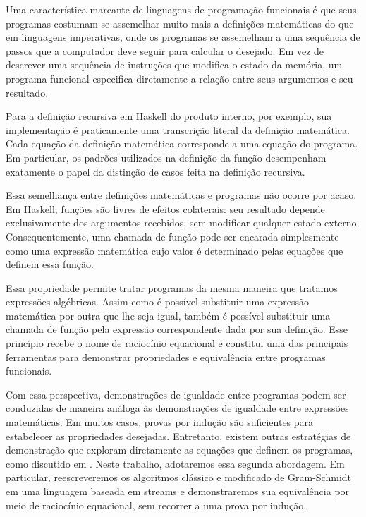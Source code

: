 
Uma característica marcante de linguagens de programação funcionais é que seus programas costumam se assemelhar muito mais a definições matemáticas do que em linguagens imperativas, onde os programas se assemelham a uma sequência de passos que a computador deve seguir para calcular o desejado. Em vez de descrever uma sequência de instruções que modifica o estado da memória, um programa funcional especifica diretamente a relação entre seus argumentos e seu resultado.

Para a definição recursiva em Haskell do produto interno, por exemplo, sua implementação é praticamente uma transcrição literal da definição matemática. Cada equação da definição matemática corresponde a uma equação do programa. Em particular, os padrões utilizados na definição da função desempenham exatamente o papel da distinção de casos feita na definição recursiva.

Essa semelhança entre definições matemáticas e programas não ocorre por acaso. Em Haskell, funções são livres de efeitos colaterais: seu resultado depende exclusivamente dos argumentos recebidos, sem modificar qualquer estado externo. Consequentemente, uma chamada de função pode ser encarada simplesmente como uma expressão matemática cujo valor é determinado pelas equações que definem essa função.

Essa propriedade permite tratar programas da mesma maneira que tratamos expressões algébricas. Assim como é possível substituir uma expressão matemática por outra que lhe seja igual, também é possível substituir uma chamada de função pela expressão correspondente dada por sua definição. Esse princípio recebe o nome de raciocínio equacional e constitui uma das principais ferramentas para demonstrar propriedades e equivalência entre programas funcionais.

Com essa perspectiva, demonstrações de igualdade entre programas podem ser conduzidas de maneira análoga às demonstrações de igualdade entre expressões matemáticas. Em muitos casos, provas por indução são suficientes para estabelecer as propriedades desejadas. Entretanto, existem outras estratégias de demonstração que exploram diretamente as equações que definem os programas, como discutido em \cite{Gibbons2005}. Neste trabalho, adotaremos essa segunda abordagem. Em particular, reescreveremos os algoritmos clássico e modificado de Gram-Schmidt em uma linguagem baseada em streams e demonstraremos sua equivalência por meio de raciocínio equacional, sem recorrer a uma prova por indução.
